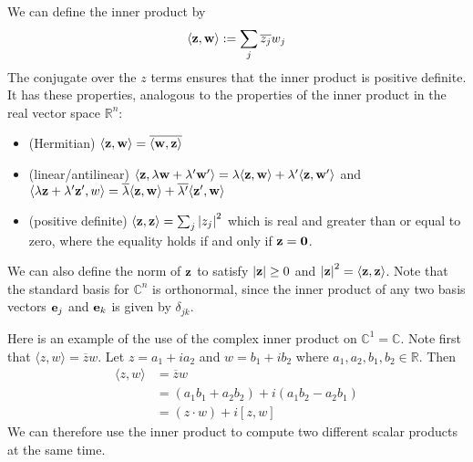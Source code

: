 We can define the inner product by
\[
	\langle \vb z, \vb w \rangle := \sum_j \overline{z_j} w_j
\]
The conjugate over the \(z\) terms ensures that the inner product is positive definite.
It has these properties, analogous to the properties of the inner product in the real vector space \(\mathbb R^n\):
\begin{itemize}
	\item (Hermitian) \(\langle \vb z, \vb w \rangle = \overline{\langle \vb w, \vb z \rangle}\)
	\item (linear/antilinear) \(\langle \vb z, \lambda \vb w + \lambda' \vb w' \rangle = \lambda \langle \vb z, \vb w \rangle + \lambda' \langle \vb z, \vb w' \rangle\) and \(\langle \lambda \vb z + \lambda' \vb z', w \rangle = \overline{\lambda} \langle \vb z, \vb w \rangle + \overline{\lambda'} \langle \vb z', \vb w \rangle\)
	\item (positive definite) \(\langle \vb z, \vb z \rangle = \sum_j \abs{z_j}^2\) which is real and greater than or equal to zero, where the equality holds if and only if \(\vb z = \vb 0\).
\end{itemize}
We can also define the norm of \(\vb z\) to satisfy \(\abs{\vb z} \geq 0\) and \(\abs{\vb z}^2 = \langle \vb z, \vb z \rangle\).
Note that the standard basis for \(\mathbb C^n\) is orthonormal, since the inner product of any two basis vectors \(\vb e_j\) and \(\vb e_k\) is given by \(\delta_{jk}\).

Here is an example of the use of the complex inner product on \(\mathbb C^1 = \mathbb C\).
Note first that \(\langle z, w \rangle = \overline z w\).
Let \(z = a_1 + ia_2\) and \(w = b_1 + ib_2\) where \(a_1, a_2, b_1, b_2 \in \mathbb R\).
Then
\begin{align*}
	\langle z, w \rangle & = \overline z w                              \\
	                     & = (a_1 b_1 + a_2 b_2) + i(a_1 b_2 - a_2 b_1) \\
	                     & = (z \cdot w) + i[z, w]
\end{align*}
We can therefore use the inner product to compute two different scalar products at the same time.
